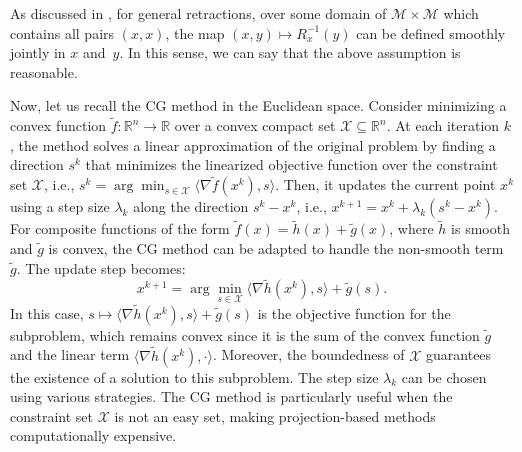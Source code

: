 \documentclass[pdflatex,sn-mathphys-num]{sn-jnl}%
\theoremstyle{definition} %
\theoremstyle{remark} %
\begin{document}
As discussed in \cite[Section 10.2]{Boumal_2023}, 
for general retractions, over some domain of \( \mathcal{M} \times \mathcal{M} \) which contains all pairs \( (x, x) \), the map 
$(x, y) \mapsto R_x^{-1}(y)$
can be defined smoothly jointly in \( x \) and~\( y \). In this sense, we can say that the above assumption is reasonable.




Now, let us recall the CG method in the Euclidean space. Consider minimizing a convex function \( \tilde{f} \colon \mathbb{R}^n \rightarrow \mathbb{R} \) over a convex compact set \( \mathcal{X} \subseteq  \mathbb{R}^n\).
At each iteration \( k \), the method solves a linear approximation of the original problem by finding a direction \( s^k \) that minimizes the linearized objective function over the constraint set \( \mathcal{X} \), i.e.,
$s^k = \arg\min_{s \in \mathcal{X}} \langle \nabla \tilde{f}(x^k), s \rangle .$
Then, it updates the current point \( x^k \) using a step size \( \lambda_k \) along the direction \( s^k - x^k \), i.e.,
$x^{k+1} = x^k + \lambda_k (s^k - x^k).$
For composite functions of the form \( \tilde{f}(x) = \tilde{h}(x) + \tilde{g}(x) \), where \( \tilde{h} \) is smooth and \( \tilde{g} \) is convex, the CG method can be adapted to handle the non-smooth term \( \tilde{g} \). The update step becomes:
\[ 
x^{k+1} = \arg\min_{s \in \mathcal{X}} \langle \nabla \tilde{h}(x^k), s \rangle + \tilde{g}(s).
\]
In this case, \( s \mapsto \langle \nabla \tilde{h}(x^k), s \rangle + \tilde{g}(s) \) is the objective function for the subproblem, which remains convex since it is the sum of the convex function  \( \tilde{g} \) and the linear term \( \langle \nabla \tilde{h}(x^k), \cdot \rangle \). Moreover, the boundedness of $\mathcal{X}$ guarantees the existence of a solution to this subproblem.
The step size \( \lambda_k \) can be chosen using various strategies. The CG method is particularly useful when the constraint set \( \mathcal{X} \) is not an easy set, making projection-based methods computationally expensive.
\end{document}
